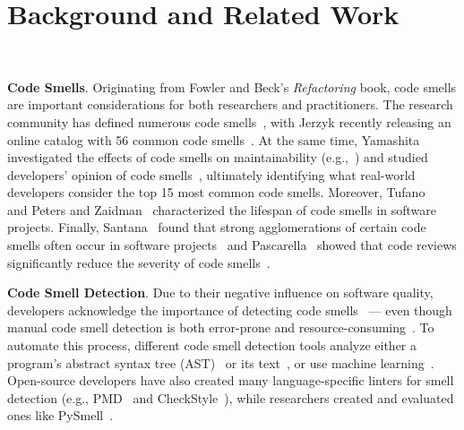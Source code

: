 \vspace*{-1em}

\section{Background and Related Work}~\label{sec:background}

\vspace*{-0.5em}


{\bf Code Smells}. Originating from Fowler and Beck's \textit{Refactoring}
book, code smells are important considerations for both researchers and
practitioners. The research community has defined numerous code
smells~\cite{Pysmell,SQLAntipatterns,CleanCode,RefactoringWorkbook}, with
Jerzyk recently releasing an online catalog with 56 common code
smells~\cite{Jerzyk2023}. At the same time, Yamashita investigated the effects
of code smells on maintainability (e.g.,~\cite{6392174, 6405287}) and studied
developers' opinion of code smells~\cite{developersCare}, ultimately
identifying what real-world developers consider the top 15 most common code
smells. Moreover, Tufano~\etal{}~\cite{whenandwhy} and Peters and
Zaidman~\cite{lifespan} characterized the lifespan of code smells in software
projects. Finally, Santana~\etal{} found that strong agglomerations of certain
code smells often occur in software projects~\cite{Santana} and
Pascarella~\etal{} showed that code reviews significantly reduce the severity
of code smells~\cite{Pascarella}.




{\bf Code Smell Detection}. Due to their negative influence on software
quality, developers acknowledge the importance of detecting code
smells~\cite{developersCare} --- even though manual code smell detection is
both error-prone and resource-consuming~\cite{DetectingDefectsInObject}.
%
To automate this process, different code smell detection tools analyze either a
program's abstract syntax tree (AST)~\cite{Lenarduzzi2023} or its
text~\cite{Palomba}, or use machine learning~\cite{ML}.
%
Open-source developers have also created many language-specific linters for
smell detection (e.g., PMD~\cite{PMD} and CheckStyle~\cite{CheckStyle}), while
researchers created and evaluated ones like PySmell~\cite{Pysmell}.

